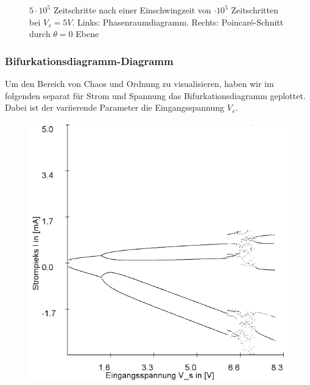 \documentclass[11,5pt, twoside]{article}
\begin{document}
\begin{figure}[!htbp]
\caption{$5\cdot10^5$ Zeitschritte nach einer Einschwingzeit von $\cdot10^5$ Zeitschritten bei $V_s=5V$. Links: Phasenraumdiagramm. Rechts: Poincaré-Schnitt durch $\theta=0$ Ebene}
\label{fig:ldr-poin1}
\end{figure}

\subsubsection{Bifurkationsdiagramm-Diagramm}
Um den Bereich von Chaos und Ordnung zu visualisieren, haben wir im folgenden separat für Strom und Spannung das Bifurkationsdiagramm geplottet. Dabei ist der variierende Parameter die Eingangsspannung $V_s$.
\begin{figure}[!htbp]
\includegraphics[scale=0.4]{schwing-bifurc-von-0-8-in-0,01schritten-400k-strom}

\end{figure}
\end{document}
